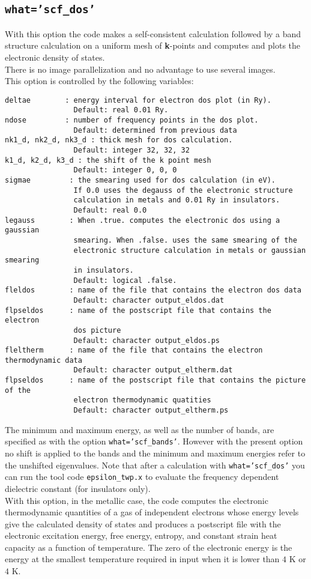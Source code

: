 \documentclass[12pt,a4paper]{article}
\begin{document}
\subsection{\color{web-blue}\texttt{what='scf\_dos'}}
With this option the code makes a self-consistent calculation followed
by a band structure calculation on a uniform mesh of {\bf k}-points and
computes and plots the electronic density of states. \\
There is no image parallelization and no advantage to use several images. \\
This option is controlled by the following variables:
\begin{verbatim} 
deltae        : energy interval for electron dos plot (in Ry).
                Default: real 0.01 Ry.
ndose         : number of frequency points in the dos plot.
                Default: determined from previous data
nk1_d, nk2_d, nk3_d : thick mesh for dos calculation.
                Default: integer 32, 32, 32
k1_d, k2_d, k3_d : the shift of the k point mesh
                Default: integer 0, 0, 0
sigmae         : the smearing used for dos calculation (in eV).
                If 0.0 uses the degauss of the electronic structure
                calculation in metals and 0.01 Ry in insulators.
                Default: real 0.0 
legauss        : When .true. computes the electronic dos using a gaussian
                smearing. When .false. uses the same smearing of the
                electronic structure calculation in metals or gaussian smearing
                in insulators.
                Default: logical .false.
fleldos        : name of the file that contains the electron dos data
                Default: character output_eldos.dat
flpseldos      : name of the postscript file that contains the electron 
                dos picture
                Default: character output_eldos.ps
fleltherm      : name of the file that contains the electron thermodynamic data 
                Default: character output_eltherm.dat
flpseldos      : name of the postscript file that contains the picture of the
                electron thermodynamic quatities
                Default: character output_eltherm.ps
\end{verbatim}
The minimum and maximum energy, as well as the number of bands,
are specified as with the option \texttt{what='scf\_bands'}.
However with the present option no shift is applied to the bands
and the minimum and maximum energies refer to the unshifted eigenvalues.
Note that after a calculation with \texttt{what='scf\_dos'} you can
run the tool code \texttt{epsilon\_twp.x} to evaluate the frequency
dependent dielectric constant (for insulators only). \\
With this option, in the metallic case, 
the code computes the electronic thermodynamic quantities of
a gas of independent electrons whose energy levels give the calculated 
density of states and produces a postscript file
with the electronic excitation energy, free energy, entropy,
and constant strain heat capacity as a function of temperature. 
The zero of the electronic energy is the energy at the smallest temperature 
required in input when it is lower than $4$ K or $4$ K. 
\end{document}
